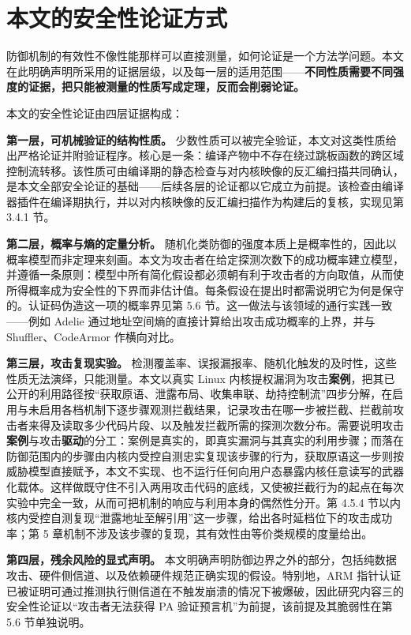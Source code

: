 \section{本文的安全性论证方式}

防御机制的有效性不像性能那样可以直接测量，如何论证是一个方法学问题。本文在此明确声明所采用的证据层级，以及每一层的适用范围——\textbf{不同性质需要不同强度的证据，把只能被测量的性质写成定理，反而会削弱论证。}

本文的安全性论证由四层证据构成：

\textbf{第一层，可机械验证的结构性质。} 少数性质可以被完全验证，本文对这类性质给出严格论证并附验证程序。核心是一条：编译产物中不存在绕过跳板函数的跨区域控制流转移。该性质可由编译期的静态检查与对内核映像的反汇编扫描共同确认，是本文全部安全论证的基础——后续各层的论证都以它成立为前提。该检查由编译器插件在编译期执行，并以对内核映像的反汇编扫描作为构建后的复核，实现见第 3.4.1 节。

\textbf{第二层，概率与熵的定量分析。} 随机化类防御的强度本质上是概率性的，因此以概率模型而非定理来刻画。本文为攻击者在给定探测次数下的成功概率建立模型，并遵循一条原则：模型中所有简化假设都必须朝有利于攻击者的方向取值，从而使所得概率成为安全性的下界而非估计值。每条假设在提出时都需说明它为何是保守的。认证码伪造这一项的概率界见第 5.6 节。这一做法与该领域的通行实践一致——例如 Adelie 通过地址空间熵的直接计算给出攻击成功概率的上界，并与 Shuffler、CodeArmor 作横向对比。

\textbf{第三层，攻击复现实验。} 检测覆盖率、误报漏报率、随机化触发的及时性，这些性质无法演绎，只能测量。本文以真实 Linux 内核提权漏洞为攻击\textbf{案例}，把其已公开的利用路径按“获取原语、泄露布局、收集串联、劫持控制流”四步分解，在启用与未启用各档机制下逐步骤观测拦截结果，记录攻击在哪一步被拦截、拦截前攻击者来得及读取多少代码片段、以及触发拦截所需的探测次数分布。需要说明攻击\textbf{案例}与攻击\textbf{驱动}的分工：案例是真实的，即真实漏洞与其真实的利用步骤；而落在防御范围内的步骤由内核内受控自测忠实复现该步骤的行为，获取原语这一步则按威胁模型直接赋予，本文不实现、也不运行任何向用户态暴露内核任意读写的武器化载体。这样做既守住不引入两用攻击代码的底线，又使被拦截行为的起点在每次实验中完全一致，从而可把机制的响应与利用本身的偶然性分开。第 4.5.4 节以内核内受控自测复现“泄露地址至解引用”这一步骤，给出各时延档位下的攻击成功率；第 5 章机制不涉及该步骤的复现，其有效性由等价类规模的度量给出。

\textbf{第四层，残余风险的显式声明。} 本文明确声明防御边界之外的部分，包括纯数据攻击、硬件侧信道、以及依赖硬件规范正确实现的假设。特别地，ARM 指针认证已被证明可通过推测执行侧信道在不触发崩溃的情况下被爆破\citep{ravichandran2022pacman}，因此研究内容三的安全性论证以“攻击者无法获得 PA 验证预言机”为前提，该前提及其脆弱性在第 5.6 节单独说明。

